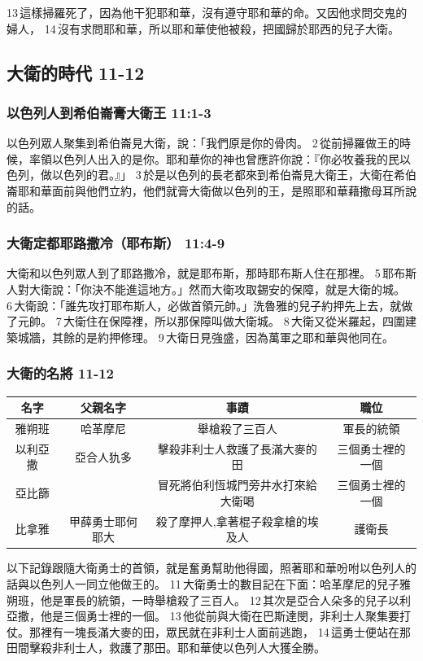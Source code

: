 13 這樣掃羅死了，因為他干犯耶和華，沒有遵守耶和華的命。又因他求問交鬼的婦人， 14 沒有求問耶和華，所以耶和華使他被殺，把國歸於耶西的兒子大衛。

\subsection{大衛的時代 11-12 }
\subsubsection{以色列人到希伯崙膏大衛王 11:1-3 }
以色列眾人聚集到希伯崙見大衛，說：「我們原是你的骨肉。 2 從前掃羅做王的時候，率領以色列人出入的是你。耶和華你的神也曾應許你說：『你必牧養我的民以色列，做以色列的君。』」 3 於是以色列的長老都來到希伯崙見大衛王，大衛在希伯崙耶和華面前與他們立約，他們就膏大衛做以色列的王，是照耶和華藉撒母耳所說的話。

\subsubsection{大衛定都耶路撒冷（耶布斯） 11:4-9 }
大衛和以色列眾人到了耶路撒冷，就是耶布斯，那時耶布斯人住在那裡。 5 耶布斯人對大衛說：「你決不能進這地方。」然而大衛攻取錫安的保障，就是大衛的城。 6 大衛說：「誰先攻打耶布斯人，必做首領元帥。」洗魯雅的兒子約押先上去，就做了元帥。 7 大衛住在保障裡，所以那保障叫做大衛城。 8 大衛又從米羅起，四圍建築城牆，其餘的是約押修理。 9 大衛日見強盛，因為萬軍之耶和華與他同在。

\subsubsection{大衛的名將 11-12 }
\begin{table}[!hbp]
\centering
\begin{tabular}{|c|c|c|c|}
\hline
\hline
名字        &父親名字 & 事蹟                     & 職位    \\\hline\hline
 雅朔班     & 哈革摩尼  & 舉槍殺了三百人    & 軍長的統領      \\\hline
以利亞撒     & 亞合人犰多  &     擊殺非利士人救護了長滿大麥的田          &  三個勇士裡的一個     \\\hline
亞比篩     &          &    冒死將伯利恆城門旁井水打來給大衛喝         &        三個勇士裡的一個 \\\hline
比拿雅    &甲薛勇士耶何耶大 &殺了摩押人,拿著棍子殺拿槍的埃及人 &   護衛長\\\hline
\end{tabular}
\end{table}
以下記錄跟隨大衛勇士的首領，就是奮勇幫助他得國，照著耶和華吩咐以色列人的話與以色列人一同立他做王的。 11 大衛勇士的數目記在下面：哈革摩尼的兒子雅朔班，他是軍長的統領，一時舉槍殺了三百人。 12 其次是亞合人朵多的兒子以利亞撒，他是三個勇士裡的一個。 13 他從前與大衛在巴斯達閔，非利士人聚集要打仗。那裡有一塊長滿大麥的田，眾民就在非利士人面前逃跑， 14 這勇士便站在那田間擊殺非利士人，救護了那田。耶和華使以色列人大獲全勝。

